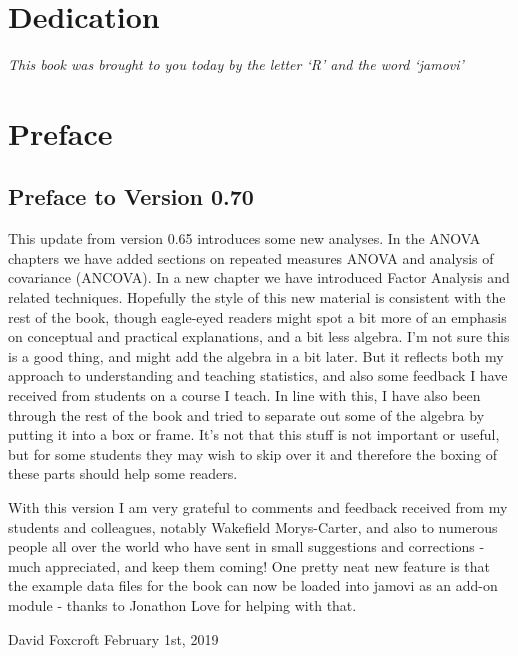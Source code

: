 \documentclass[
]{book}
\begin{document}
\hypertarget{dedication}{%
\chapter*{Dedication}\label{dedication}}

\emph{This book was brought to you today by the letter `R' and the word `jamovi'}

\hypertarget{preface}{%
\chapter*{Preface}\label{preface}}

\hypertarget{preface-to-version-0.70}{%
\section{Preface to Version 0.70}\label{preface-to-version-0.70}}

This update from version 0.65 introduces some new analyses. In the ANOVA chapters we have added sections on repeated measures ANOVA and analysis of covariance (ANCOVA). In a new chapter we have introduced Factor Analysis and related techniques. Hopefully the style of this new material is consistent with the rest of the book, though eagle-eyed readers might spot a bit more of an emphasis on conceptual and practical explanations, and a bit less algebra. I'm not sure this is a good thing, and might add the algebra in a bit later. But it reflects both my approach to understanding and teaching statistics, and also some feedback I have received from students on a course I teach. In line with this, I have also been through the rest of the book and tried to separate out some of the algebra by putting it into a box or frame. It's not that this stuff is not important or useful, but for some students they may wish to skip over it and therefore the boxing of these parts should help some readers.

With this version I am very grateful to comments and feedback received from my students and colleagues, notably Wakefield Morys-Carter, and also to numerous people all over the world who have sent in small suggestions and corrections - much appreciated, and keep them coming! One pretty neat new feature is that the example data files for the book can now be loaded into jamovi as an add-on module - thanks to Jonathon Love for helping with that.

David Foxcroft
February 1st, 2019
\end{document}
